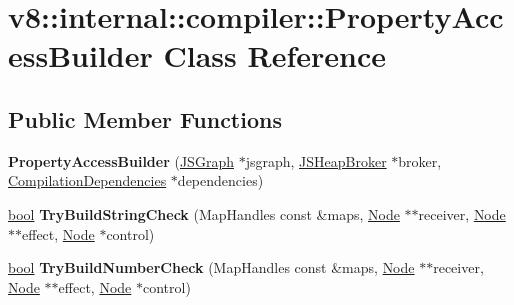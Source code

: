 \hypertarget{classv8_1_1internal_1_1compiler_1_1PropertyAccessBuilder}{}\section{v8\+:\+:internal\+:\+:compiler\+:\+:Property\+Access\+Builder Class Reference}
\label{classv8_1_1internal_1_1compiler_1_1PropertyAccessBuilder}
\subsection*{Public Member Functions}
\begin{DoxyCompactItemize}
\item 
\mbox{\label{classv8_1_1internal_1_1compiler_1_1PropertyAccessBuilder_a22ef411e313010ebe6e9021728909a00}} 
{\bfseries Property\+Access\+Builder} (\mbox{\hyperlink{classv8_1_1internal_1_1compiler_1_1JSGraph}{J\+S\+Graph}} $\ast$jsgraph, \mbox{\hyperlink{classv8_1_1internal_1_1compiler_1_1JSHeapBroker}{J\+S\+Heap\+Broker}} $\ast$broker, \mbox{\hyperlink{classv8_1_1internal_1_1compiler_1_1CompilationDependencies}{Compilation\+Dependencies}} $\ast$dependencies)
\item 
\mbox{\label{classv8_1_1internal_1_1compiler_1_1PropertyAccessBuilder_ae34e4af1d8f2eaf0c320d7dbb4bab2c2}} 
\mbox{\hyperlink{classbool}{bool}} {\bfseries Try\+Build\+String\+Check} (Map\+Handles const \&maps, \mbox{\hyperlink{classv8_1_1internal_1_1compiler_1_1Node}{Node}} $\ast$$\ast$receiver, \mbox{\hyperlink{classv8_1_1internal_1_1compiler_1_1Node}{Node}} $\ast$$\ast$effect, \mbox{\hyperlink{classv8_1_1internal_1_1compiler_1_1Node}{Node}} $\ast$control)
\item 
\mbox{\label{classv8_1_1internal_1_1compiler_1_1PropertyAccessBuilder_ae12f481a8da9d8b300c91608be7d3c6b}} 
\mbox{\hyperlink{classbool}{bool}} {\bfseries Try\+Build\+Number\+Check} (Map\+Handles const \&maps, \mbox{\hyperlink{classv8_1_1internal_1_1compiler_1_1Node}{Node}} $\ast$$\ast$receiver, \mbox{\hyperlink{classv8_1_1internal_1_1compiler_1_1Node}{Node}} $\ast$$\ast$effect, \mbox{\hyperlink{classv8_1_1internal_1_1compiler_1_1Node}{Node}} $\ast$control)

\end{DoxyCompactItemize}
